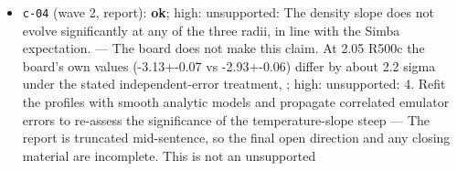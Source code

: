 \documentclass[11pt,a4paper]{article}
\begin{document}
\begin{itemize}
  \item \texttt{c-04} (wave 2, report): \textbf{ok}; high: unsupported: The density slope does not evolve significantly at any of the three radii, in line with the Simba expectation. --- The board does not make this claim. At 2.05 R500c the board's own values (-3.13+-0.07 vs -2.93+-0.06) differ by about 2.2 sigma under the stated independent-error treatment, ; high: unsupported: 4. Refit the profiles with smooth analytic models and propagate correlated emulator errors to re-assess the significance of the temperature-slope steep --- The report is truncated mid-sentence, so the final open direction and any closing material are incomplete. This is not an unsupported
\end{itemize}
\end{document}
